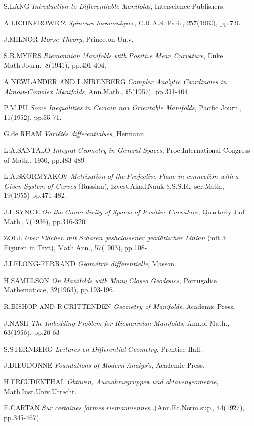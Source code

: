 \begin{thebibliography}{99}
 S.\@ LANG {\em Introduction to Differentiable Manifolds},
  Interscience Publishers.

 A.\@ LICHNEROWICZ {\em Spineurs harmoniques}, C.R.A.S.\@
  Paris, 257(1963), pp.7-9.

 J.\@ MILNOR {\em Morse Theory}, Princeton Univ.

 S.B.\@ MYERS {\em Riemannian Manifolds with Positive Mean
  Curvature}, Duke Math.\@ Journ., 8(1941), pp.401-404.

 A.\@ NEWLANDER AND L.\@ NIRENBERG {\em Complex Analytic
  Coordinates in Almost-Complex Manifolds}, Ann.\@ Math.,
  65(1957). pp.391-404.


 P.M.\@ PU {\em Some Inequalities in Certain non
  Orientable Manifolds}, Pacific Journ., 11(1952), pp.55-71.

 G.\@ de RHAM {\em Vari\'et\'es differentiables}, Hermann.

 L.A.\@ SANTALO {\em Integral Geometry in General Spaces},
  Proc.\@ International Congress of Math., 1950, pp.483-489.

 L.A.\@ SKORMYAKOV {\em Metrization of the Projective
  Plane in connection with a Given System of Curves} (Russian),
  Izvest.\@ Akad.\@ Nauk S.S.S.R., ser.\@ Math., 19(1955) pp.471-482.

 J.L.\@ SYNGE {\em On the Connectivity of Spaces of
  Positive Curvature}, Quarterly J.\@ of Math., 7(1936), pp.316-320.

 ZOLL {\em Uber Fl\"achen mit Scharen geshclossener
  geod\"atischer Linian} (mit 3 Figuren in Text), Math.\@ Ann.,
  57(1903), pp.108-

 J.\@ LELONG-FERRAND {\em G\'eom\'etrie diff\'erentielle},
  Masson. 

 H.\@ SAMELSON {\em On Manifolds with Many Closed
  Geodesics}, Portugalise Mathematicae, 32(1963), pp.193-196.

 R.\@ BISHOP AND R.\@ CRITTENDEN {\em Geometry of
  Manifolds}, Academic Press.

 J.\@ NASH {\em The Imbedding Problem for Riemannian
  Manifolds}, Ann.\@ of Math., 63(1956), pp.20-63

 S.\@ STERNBERG {\em Lectures on Differential Geometry},
  Prentice-Hall. 

 J.\@ DIEUDONNE {\em Foundations of Modern Analysis,}
  Academic Press.

 H.\@ FREUDENTHAL {\em Oktaven, Ausnahmegruppen und
  oktavengeometrie}, Math.\@ Inst.\@ Univ.\@ Utrecht.

 E.\@ CARTAN {\em Sur certaines formes
  riemanniennes}\ldots (Ann.\@ Ec.\@ Norm.\@ sup., 44(1927), pp.345-467).
\end{thebibliography}

